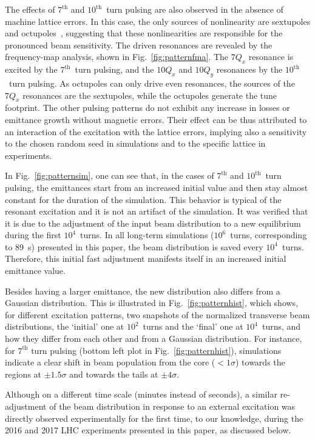\documentclass[%
 reprint,
 amsmath,amssymb,
 aps,
prstab,
longbibliography
]{revtex4-1}
\begin{document}
The effects of $7^{\mathrm{th}}$ and $10^{\mathrm{th}}$~turn pulsing
are also observed in the absence of machine lattice errors. In this
case, the only sources of nonlinearity are sextupoles and
octupoles~\cite{md_sim_hel_res_ex_fitterer}, suggesting that these
nonlinearities are responsible for the pronounced beam
sensitivity. The driven resonances are revealed by the frequency-map
analysis, shown in Fig.~\ref{fig:patternfma}. The $7 Q_x$ resonance is
excited by the $7^{\mathrm{th}}$~turn pulsing, and the $10 Q_x$ and
$10 Q_y$ resonances by the $10^{\mathrm{th}}$~turn pulsing. As
octupoles can only drive even resonances, the sources of the $7 Q_x$
resonances are the sextupoles, while the octupoles generate the tune
footprint. The other pulsing patterns do not exhibit any increase in
losses or emittance growth without magnetic errors. Their effect can
be thus attributed to an interaction of the excitation with the
lattice errors, implying also a sensitivity to the chosen random seed
in simulations and to the specific lattice in experiments.

In Fig.~\ref{fig:patternsim}, one can see that, in the cases of
$7^{\mathrm{th}}$ and $10^{\mathrm{th}}$~turn pulsing, the emittances
start from an increased initial value and then stay almost constant
for the duration of the simulation. This behavior is typical of the
resonant excitation and it is not an artifact of the simulation. It
was verified that it is due to the adjustment of the input beam
distribution to a new equilibrium during the first $10^4$~turns. In
all long-term simulations ($10^6$~turns, corresponding to 89~s)
presented in this paper, the beam distribution is saved every
$10^4$~turns. Therefore, this initial fast adjustment manifests itself
in an increased initial emittance value.

Besides having a larger emittance, the new distribution also differs
from a Gaussian distribution.  This is illustrated in
Fig.~\ref{fig:patternhist}, which shows, for different excitation
patterns, two snapshots of the normalized transverse beam
distributions, the `initial' one at $10^2$~turns and the `final' one
at $10^4$~turns, and how they differ from each other and from a
Gaussian distribution. For instance, for $7^{\mathrm{th}}$ turn
pulsing (bottom left plot in Fig.~\ref{fig:patternhist}), simulations
indicate a clear shift in beam population from the core ($< 1\sigma$)
towards the regions at $\pm 1.5\sigma$ and towards the tails at
$\pm 4\sigma$.

Although on a different time scale (minutes instead of seconds), a
similar re-adjustment of the beam distribution in response to an
external excitation was directly observed experimentally for the first
time, to our knowledge, during the 2016 and 2017 LHC experiments
presented in this paper, as discussed below.
\end{document}
